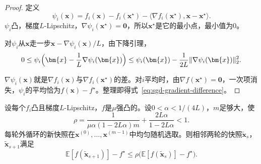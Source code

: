 \begin{proof}
定义
\[
 \psi_i(\bm{x})=f_i(\bm{x})-f_i(\bm{x}^\star)-\langle\nabla f_i(\bm{x}^\star),\bm{x}-\bm{x}^\star\rangle.
\]
$\psi_i$凸，梯度$L$-Lipschitz，$\nabla\psi_i(\bm{x}^\star)=\bm{0}$，所以$\bm{x}^\star$是它的最小点，最小值为$0$。

对$\psi_i$从$\bm{x}$走一步$\bm{x}-\nabla\psi_i(\bm{x})/L$，由下降引理，
\[
 0\leq\psi_i\Bigl(\bm{x}-\frac{1}{L}\nabla\psi_i(\bm{x})\Bigr)\leq\psi_i(\bm{x})-\frac{1}{2L}\lVert\nabla\psi_i(\bm{x})\rVert_2^2.
\]

$\nabla\psi_i(\bm{x})$就是$\nabla f_i(\bm{x})$与$\nabla f_i(\bm{x}^\star)$的差。对$i$平均时，由$\nabla f(\bm{x}^\star)=\bm{0}$，一次项消失，$\psi_i$的平均恰为$f(\bm{x})-f^\star$。整理即得式~\eqref{eq:sgd-gradient-difference}。
\end{proof}

\begin{theorem}[SVRG的线性收缩]
\label{thm:sgd-svrg}
设每个$f_i$凸且梯度$L$-Lipschitz，$f$是$\mu$强凸的。设$0<\alpha<1/(4L)$，$m$足够大，使
\begin{equation}
 \rho=\frac{1}{\mu\alpha(1-2L\alpha)m}+\frac{2L\alpha}{1-2L\alpha}<1.
 \label{eq:sgd-svrg-rate}
\end{equation}
每轮外循环的新快照在$\bm{x}^{(0)},\ldots,\bm{x}^{(m-1)}$中均匀随机选取。则相邻两轮的快照$\tilde{\bm{x}}_{s}$，$\tilde{\bm{x}}_{s+1}$满足
\begin{equation}
 \mathbb{E}[f(\tilde{\bm{x}}_{s+1})]-f^\star\leq\rho\bigl(\mathbb{E}[f(\tilde{\bm{x}}_s)]-f^\star\bigr).
 \label{eq:sgd-svrg-contraction}
\end{equation}
\end{theorem}

